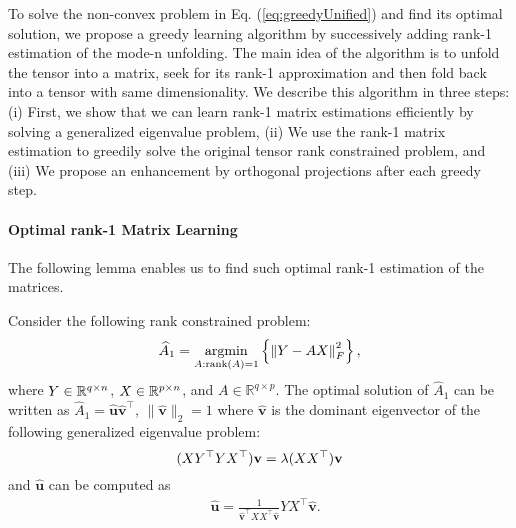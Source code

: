 To solve the non-convex problem in Eq. (\ref{eq:greedyUnified}) and find its optimal solution, we propose a greedy learning algorithm by successively adding rank-1 estimation of the mode-n unfolding. The main idea of the algorithm is to unfold the tensor into a matrix,  seek for its rank-1 approximation and then fold back into a tensor with same dimensionality. We describe this algorithm in three steps: (i) First, we show that we can learn rank-1 matrix estimations efficiently by solving a generalized eigenvalue problem, (ii) We use the rank-1 matrix estimation to greedily solve the original tensor rank constrained problem, and (iii) We propose an enhancement by orthogonal projections after each greedy step.

\paragraph{Optimal rank-1 Matrix Learning} %
The following lemma enables us to find such optimal rank-1 estimation of the matrices.

\begin{lemma}
\label{lem:rank1opt}
Consider the following rank constrained problem:
\begin{equation}
\widehat{A}_1 = \operatorname*{argmin}_{A: \mathrm{rank}(A) = 1} \left\{ \left\| Y - AX\right\|_F^2 \right\},
\label{eq:rank1estimate}
\end{equation}
\noindent where $Y \in {{\mathbb R}}^{q\times n}$, $X \in {{\mathbb R}}^{p\times n}$, and $A\in \mathbb{R}^{q\times p}$. The optimal solution of $\widehat{A}_1$ can be written as $\widehat{A}_1 = \widehat{\mathbf{u}}\widehat{\mathbf{v}}^{\top}$, $\|\widehat{\mathbf{v}}\|_2 = 1$ where $\widehat{\mathbf{v}}$ is the dominant eigenvector of the following generalized eigenvalue problem:
\begin{equation}
(XY^{\top}YX^{\top})\mathbf{v} = \lambda (XX^{\top})\mathbf{v}\label{eq:solv}\\
\end{equation}
and $\widehat{\mathbf{u}}$ can be computed as
\begin{align}
&\widehat{\mathbf{u}} = \frac{1}{\widehat{\mathbf{v}}^{\top}XX^{\top}\widehat{\mathbf{v}}}YX^{\top}\widehat{\mathbf{v}}. \label{eq:solu}
\end{align}
\end{lemma}

